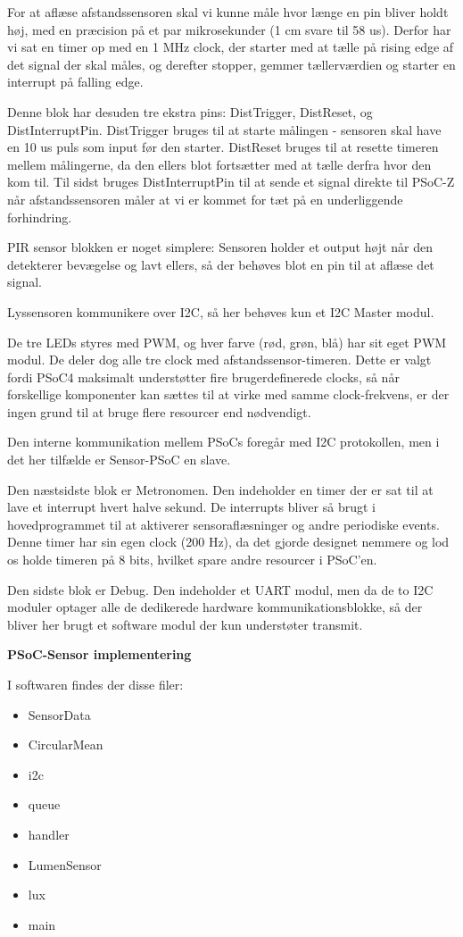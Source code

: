 For at aflæse afstandssensoren skal vi kunne måle hvor længe en pin bliver holdt høj, med en præcision på et par mikrosekunder (1 cm svare til 58 us). Derfor har vi sat en timer op med en 1 MHz clock, der starter med at tælle på rising edge af det signal der skal måles, og derefter stopper, gemmer tællerværdien og starter en interrupt på falling edge. 

Denne blok har desuden tre ekstra pins: DistTrigger, DistReset, og DistInterruptPin. DistTrigger bruges til at starte målingen - sensoren skal have en 10 us puls som input før den starter. DistReset bruges til at resette timeren mellem målingerne, da den ellers blot fortsætter med at tælle derfra hvor den kom til. Til sidst bruges DistInterruptPin til at sende et signal direkte til PSoC-Z når afstandssensoren måler at vi er kommet for tæt på en underliggende forhindring.

PIR sensor blokken er noget simplere: Sensoren holder et output højt når den detekterer bevægelse og lavt ellers, så der behøves blot en pin til at aflæse det signal.

Lyssensoren kommunikere over I2C, så her behøves kun et I2C Master modul.

De tre LEDs styres med PWM, og hver farve (rød, grøn, blå) har sit eget PWM modul. De deler dog alle tre clock med afstandssensor-timeren. Dette er valgt fordi PSoC4 maksimalt understøtter fire brugerdefinerede clocks, så når forskellige komponenter kan sættes til at virke med samme clock-frekvens, er der ingen grund til at bruge flere resourcer end nødvendigt.

Den interne kommunikation mellem PSoCs foregår med I2C protokollen, men i det her tilfælde er Sensor-PSoC en slave.

Den næstsidste blok er Metronomen. Den indeholder en timer der er sat til at lave et interrupt hvert halve sekund. De interrupts bliver så brugt i hovedprogrammet til at aktiverer sensoraflæsninger og andre periodiske events. Denne timer har sin egen clock (200 Hz), da det gjorde designet nemmere og lod os holde timeren på 8 bits, hvilket spare andre resourcer i PSoC'en.

Den sidste blok er Debug. Den indeholder et UART modul, men da de to I2C moduler optager alle de dedikerede hardware kommunikationsblokke, så der bliver her brugt et software modul der kun understøter transmit.

{\centering\textbf{PSoC-Sensor implementering}\par}

I softwaren findes der disse filer:
\begin{itemize}
	\item SensorData
	\item CircularMean
	\item i2c
	\item queue
	\item handler
	\item LumenSensor
	\item lux
	\item main
\end{itemize}

